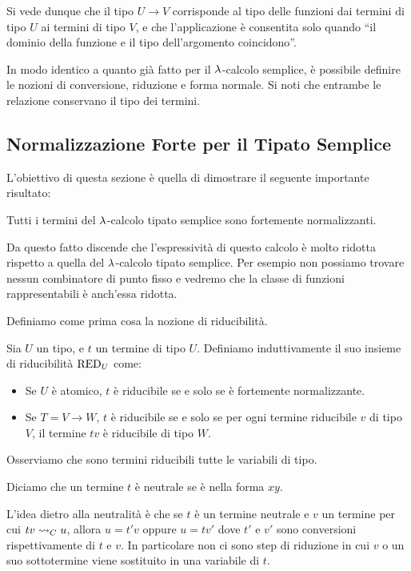 \documentclass[]{marticle}
\begin{document}
Si vede dunque che il tipo $U\rightarrow V$ corrisponde al tipo delle funzioni
dai termini di tipo $U$ ai termini di tipo $V$, e che l'applicazione \`e
consentita solo quando ``il dominio della funzione e il tipo dell'argomento
coincidono''.

In modo identico a quanto gi\`a fatto per il $\lambda$-calcolo semplice, \`e
possibile definire le nozioni di conversione, riduzione e forma normale. Si noti
che entrambe le relazione conservano il tipo dei termini.

\subsection{Normalizzazione Forte per il Tipato Semplice}
L'obiettivo di questa sezione \`e quella di dimostrare il seguente importante
risultato:
\begin{block}[Teorema]
    Tutti i termini del $\lambda$-calcolo tipato semplice sono fortemente
    normalizzanti.
\end{block}

Da questo fatto discende che l'espressivit\`a di questo calcolo \`e molto
ridotta rispetto a quella del $\lambda$-calcolo tipato semplice. Per esempio non
possiamo trovare nessun combinatore di punto fisso e vedremo che la classe di
funzioni rappresentabili \`e anch'essa ridotta.

Definiamo come prima cosa la nozione di riducibilit\`a. 
\begin{block}[Definizione]
    Sia $U$ un tipo, e $t$ un termine di tipo $U$. Definiamo induttivamente il
    suo insieme di riducibilit\`a $\text{RED}_{U}$ come:
    \begin{itemize}
        \item Se $U$ \`e atomico, $t$ \`e riducibile se e solo se \`e fortemente
            normalizzante.
        \item Se $T = V \rightarrow W$, $t$ \`e riducibile se e solo se per ogni
            termine riducibile $v$ di tipo $V$, il termine $tv$ \`e riducibile
            di tipo $W$.
    \end{itemize}
\end{block}

Osserviamo che sono termini riducibili tutte le variabili di tipo.

\begin{block}[Definizione]
    Diciamo che un termine $t$ \`e neutrale se \`e nella forma $xy$.
\end{block}

L'idea dietro alla neutralit\`a \`e che se $t$ \`e un termine neutrale e $v$ un
termine per cui $tv \rightsquigarrow_C u$, allora $u = t' v$ oppure $u=tv'$ dove $t'$ e $v'$
sono conversioni rispettivamente di $t$ e $v$. In particolare non ci sono
step di riduzione in cui $v$ o un suo sottotermine viene sostituito in una
variabile di $t$.
\end{document}
